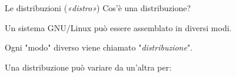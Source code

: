 \begin{slide}{Le distribuzioni (\emph{«distro»})}
Cos'è una distribuzione?

Un sistema GNU/Linux può essere assemblato in diversi modi.

Ogni "modo" diverso viene chiamato "\emph{distribuzione}".

Una distribuzione può variare da un'altra per:

{\small
{}
}
\end{slide}


